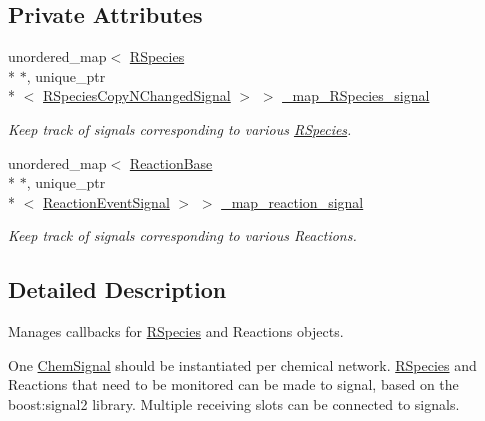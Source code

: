 \subsection*{Private Attributes}
\begin{DoxyCompactItemize}
\item 
unordered\+\_\+map$<$ \hyperlink{classRSpecies}{R\+Species} \\*
$\ast$, unique\+\_\+ptr\\*
$<$ \hyperlink{Signaling_8h_a0e8f1e8752c518bbfbcfe0147eca4587}{R\+Species\+Copy\+N\+Changed\+Signal} $>$ $>$ \hyperlink{classChemSignal_a01513b0756cb765b0fd02a7e5497133d}{\+\_\+map\+\_\+\+R\+Species\+\_\+signal}
\begin{DoxyCompactList}\small\item\em Keep track of signals corresponding to various \hyperlink{classRSpecies}{R\+Species}. \end{DoxyCompactList}\item 
unordered\+\_\+map$<$ \hyperlink{classReactionBase}{Reaction\+Base} \\*
$\ast$, unique\+\_\+ptr\\*
$<$ \hyperlink{Signaling_8h_a474e8de96ad1d2e184edd4655b5367a5}{Reaction\+Event\+Signal} $>$ $>$ \hyperlink{classChemSignal_a750129c5a876c652e76e2a008b21b276}{\+\_\+map\+\_\+reaction\+\_\+signal}
\begin{DoxyCompactList}\small\item\em Keep track of signals corresponding to various Reactions. \end{DoxyCompactList}\end{DoxyCompactItemize}


\subsection{Detailed Description}
Manages callbacks for \hyperlink{classRSpecies}{R\+Species} and Reactions objects. 

One \hyperlink{classChemSignal}{Chem\+Signal} should be instantiated per chemical network. \hyperlink{classRSpecies}{R\+Species} and Reactions that need to be monitored can be made to signal, based on the boost\+:signal2 library. Multiple receiving slots can be connected to signals.


